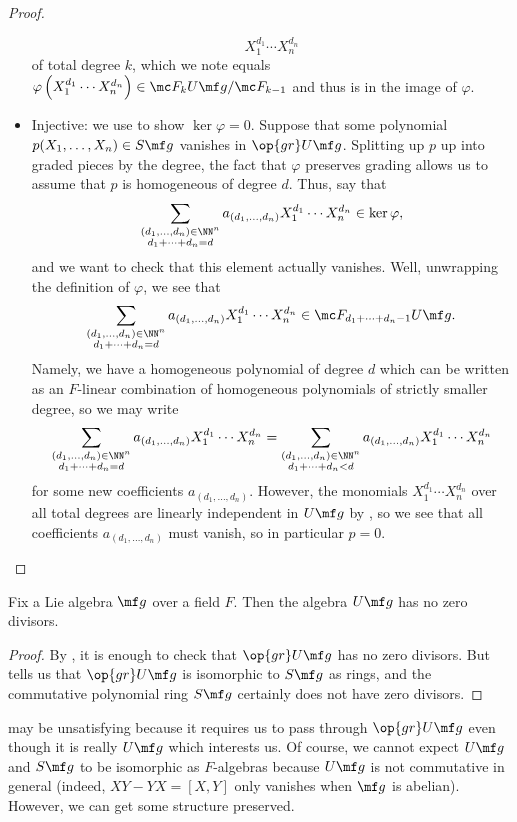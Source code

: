 \documentclass[../notes.tex]{subfiles}
\begin{document}
\begin{proof}
\begin{itemize}
		\[X_1^{d_1}\cdots X_n^{d_n}\]
		of total degree $k$, which we note equals $\varphi\left(X_1^{d_1}\cdots X_n^{d_n}\right)\in\mc F_kU\mf g/\mc F_{k-1}$ and thus is in the image of $\varphi$.
		\item Injective: we use  to show $\ker\varphi=0$. Suppose that some polynomial $p(X_1,\ldots,X_n)\in S\mf g$ vanishes in $\op{gr}U\mf g$. Splitting up $p$ up into graded pieces by the degree, the fact that $\varphi$ preserves grading allows us to assume that $p$ is homogeneous of degree $d$. Thus, say that
		\[\sum_{\substack{(d_1,\ldots,d_n)\in\NN^n\\d_1+\cdots+d_n=d}}a_{(d_1,\ldots,d_n)}X_1^{d_1}\cdots X_n^{d_n}\in\ker\varphi,\]
		and we want to check that this element actually vanishes. Well, unwrapping the definition of $\varphi$, we see that
		\[\sum_{\substack{(d_1,\ldots,d_n)\in\NN^n\\d_1+\cdots+d_n=d}}a_{(d_1,\ldots,d_n)}X_1^{d_1}\cdots X_n^{d_n}\in\mc F_{d_1+\cdots+d_n-1}U\mf g.\]
		Namely, we have a homogeneous polynomial of degree $d$ which can be written as an $F$-linear combination of homogeneous polynomials of strictly smaller degree, so we may write
		\[\sum_{\substack{(d_1,\ldots,d_n)\in\NN^n\\d_1+\cdots+d_n=d}}a_{(d_1,\ldots,d_n)}X_1^{d_1}\cdots X_n^{d_n}=\sum_{\substack{(d_1,\ldots,d_n)\in\NN^n\\d_1+\cdots+d_n<d}}a_{(d_1,\ldots,d_n)}X_1^{d_1}\cdots X_n^{d_n}\]
		for some new coefficients $a_{(d_1,\ldots,d_n)}$. However, the monomials $X_1^{d_1}\cdots X_n^{d_n}$ over all total degrees are linearly independent in $U\mf g$ by , so we see that all coefficients $a_{(d_1,\ldots,d_n)}$ must vanish, so in particular $p=0$.
		\qedhere
	\end{itemize}
\end{proof}
\begin{corollary}
	Fix a Lie algebra $\mf g$ over a field $F$. Then the algebra $U\mf g$ has no zero divisors.
\end{corollary}
\begin{proof}
	By , it is enough to check that $\op{gr}U\mf g$ has no zero divisors. But  tells us that $\op{gr}U\mf g$ is isomorphic to $S\mf g$ as rings, and the commutative polynomial ring $S\mf g$ certainly does not have zero divisors.
\end{proof}
 may be unsatisfying because it requires us to pass through $\op{gr}U\mf g$ even though it is really $U\mf g$ which interests us. Of course, we cannot expect $U\mf g$ and $S\mf g$ to be isomorphic as $F$-algebras because $U\mf g$ is not commutative in general (indeed, $XY-YX=[X,Y]$ only vanishes when $\mf g$ is abelian). However, we can get some structure preserved.
\end{document}

